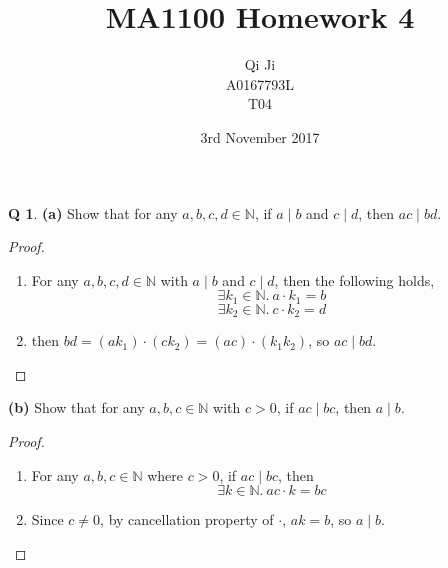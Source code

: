 \documentclass[12pt]{article}
\title{MA1100 Homework 4}
\author{Qi Ji\\
    \small A0167793L\\
    \footnotesize T04}
\date{3rd November 2017}
\theoremstyle{definition}
\newtheorem{qn}{Q}
\numberwithin{equation}{qn}
\newcommand{\nat}{\mathbb{N}}
\newenvironment{prf}
{
    \begin{proof}
        \hfill
        \begin{enumerate}[label*=\arabic*.]
                }
                {
                \hfill\qedsymbol
        \end{enumerate}
    \renewcommand{\qedsymbol}{}
    \end{proof}
}
\begin{document}
\maketitle

\begin{qn}
\textbf{(a)}
Show that for any $a,b,c,d\in\nat$, if $a\mid b$ and $c\mid d$, then $ac\mid bd$.
\end{qn}
\begin{prf}
\item For any $a,b,c,d\in\nat$ with $a\mid b$ and $c\mid d$, then the following holds,
    $$\exists k_1\in\nat.~ a\cdot k_1 = b$$
    $$\exists k_2\in\nat.~ c\cdot k_2 = d$$
\item then $bd = (ak_1)\cdot (ck_2) = (ac)\cdot(k_1k_2)$, so $ac\mid bd$.
\end{prf}
\textbf{\phantom{Q 1. }(b)}
Show that for any $a,b,c\in\nat$ with $c>0$, if $ac\mid bc$, then $a\mid b$.
\begin{prf}
\item For any $a,b,c \in\nat$ where $c> 0$, if $ac\mid bc$, then
    $$\exists k\in\nat.~ ac\cdot k = bc$$
\item Since $c\ne 0$, by cancellation property of $\cdot$, $ak = b$, so $a\mid b$.
\end{prf}
\end{document}
